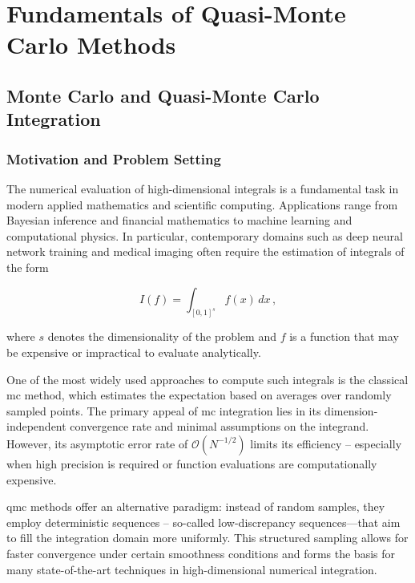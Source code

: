 \part{Fundamentals of Quasi-Monte Carlo Methods}
\label{part1}

\chapter{Monte Carlo and Quasi-Monte Carlo Integration}
\label{chapter1}

\section{Motivation and Problem Setting}
The numerical evaluation of high-dimensional integrals is a fundamental task in
modern applied mathematics and scientific computing. Applications range from
Bayesian inference and financial mathematics to machine learning and
computational physics. In particular, contemporary domains such as deep neural
network training and medical imaging often require the estimation of integrals
of the form

\begin{equation}
    \label{eq:integration_problem}
    I(f) = \int_{[0,1]^s} f(x)\,dx\,,
\end{equation}

where $s$ denotes the dimensionality of the problem and $f$ is a function that
may be expensive or impractical to evaluate analytically.

One of the most widely used approaches to compute such integrals is the
classical \ac{mc} method, which estimates the expectation based on averages over
randomly sampled points. The primary appeal of \ac{mc} integration lies in its
dimension-independent convergence rate and minimal assumptions on the integrand.
However, its asymptotic error rate of $\mathcal{O}(N^{-1/2})$ limits its
efficiency -- especially when high precision is required or function evaluations
are computationally expensive.

\ac{qmc} methods offer an alternative paradigm: instead of random samples, they employ deterministic sequences -- so-called low-discrepancy sequences—that aim to fill the integration domain more uniformly. This structured sampling allows for faster convergence under certain smoothness conditions and forms the basis for many state-of-the-art techniques in high-dimensional numerical integration.

